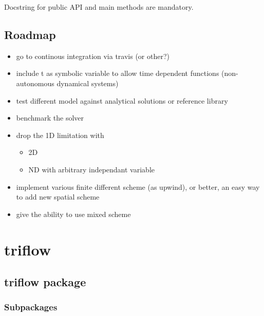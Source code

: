 \documentclass[letterpaper,10pt,english]{sphinxmanual}
\begin{document}
Docstring for public API and main methods are mandatory.


\section{Roadmap}
\label{\detokenize{contribute:roadmap}}\begin{itemize}
\item {} 
go to continous integration via travis (or other?)

\item {} 
include t as symbolic variable to allow time dependent functions (non-autonomous dynamical systems)

\item {} 
test different model against analytical solutions or reference library

\item {} 
benchmark the solver

\item {} 
drop the 1D limitation with
\begin{itemize}
\item {} 
2D

\item {} 
ND with arbitrary independant variable

\end{itemize}

\item {} 
implement various finite different scheme (as upwind), or better, an easy way to add new spatial scheme

\item {} 
give the ability to use mixed scheme

\end{itemize}


\chapter{triflow}
\label{\detokenize{modules:github-repository}}\label{\detokenize{modules::doc}}\label{\detokenize{modules:triflow}}

\section{triflow package}
\label{\detokenize{triflow:triflow-package}}\label{\detokenize{triflow::doc}}

\subsection{Subpackages}
\label{\detokenize{triflow:subpackages}}
\end{document}
